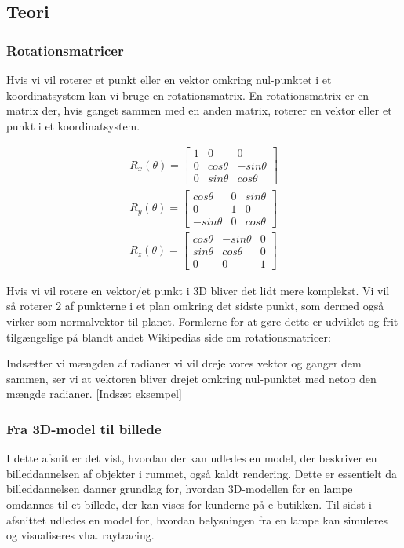 \subsection{Teori}

\subsubsection{Rotationsmatricer}
Hvis vi vil roterer et punkt eller en vektor omkring nul-punktet i et koordinatsystem kan vi bruge en rotationsmatrix\cite{rotationsmatricer}.
En rotationsmatrix er en matrix der, hvis ganget sammen med en anden matrix, roterer en vektor eller et punkt i et koordinatsystem. 

\begin{align}\label{eu_eqn}
R_x(\theta) = 
\begin{bmatrix}
1 & 0 & 0\\ 
0 & cos \theta & - sin \theta\\ 
0 & sin \theta & cos \theta
\end{bmatrix}\\
R_y(\theta) = 
\begin{bmatrix}
cos \theta  & 0 & sin \theta\\ 
0           & 1 & 0\\ 
-sin \theta & 0 & cos \theta
\end{bmatrix}\\
R_z(\theta) = 
\begin{bmatrix}
cos \theta & - sin \theta & 0\\ 
sin \theta & cos \theta & 0\\
0 & 0 & 1
\end{bmatrix}
\end{align}

Hvis vi vil rotere en vektor/et punkt i 3D bliver det lidt mere komplekst. Vi vil så roterer 2 af punkterne i et plan omkring det sidste punkt, som dermed også virker som normalvektor til planet. Formlerne for at gøre dette er udviklet og frit tilgængelige på blandt andet Wikipedias side om rotationsmatricer:

Indsætter vi mængden af radianer vi vil dreje vores vektor og ganger dem sammen, ser vi at vektoren bliver drejet omkring nul-punktet med netop den mængde radianer.
[Indsæt eksempel]

\subsubsection{Fra 3D-model til billede}
I dette afsnit er det vist, hvordan der kan udledes en model, der beskriver en billeddannelsen af objekter i rummet, også kaldt rendering. Dette er essentielt da billeddannelsen danner grundlag for, hvordan 3D-modellen for en lampe omdannes til et billede, der kan vises for kunderne på e-butikken. Til sidst i afsnittet udledes en model for, hvordan belysningen fra en lampe kan simuleres og visualiseres vha. raytracing. 


